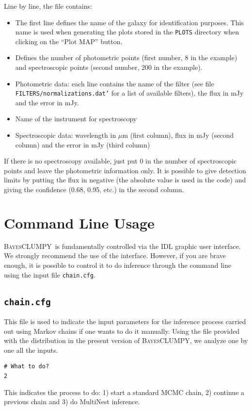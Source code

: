 \documentclass[12pt]{article}
\def\B{\textsc{BayesCLUMPY}}
\begin{document}
Line by line, the file contains:
\begin{itemize}
\item The first line defines the name of the galaxy for identification purposes. This
name is used when generating the plots stored in the \texttt{PLOTS} directory when
clicking on the ``Plot MAP'' button.
\item Defines the number of photometric points (first number, 8 in the example) and spectroscopic points (second number, 200 in the example).
\item Photometric data: each line contains the name of the filter (see file \texttt{FILTERS/normalizations.dat'} for
a list of available filters), the flux in mJy and the error in mJy.
\item Name of the instrument for spectroscopy
\item Spectroscopic data: wavelength in $\mu$m (first column), flux in mJy (second column) and the error in mJy (third column)
\end{itemize}
If there is no spectroscopy available, just put 0 in the number of spectroscopic points and leave the photometric information only.
It is possible to give detection limits by putting the flux in negative (the
absolute value is used in the code) and giving the confidence (0.68, 0.95, etc.) in the second
column.


\section{Command Line Usage}
\B\ is fundamentally controlled via the IDL graphic user interface. We strongly
recommend the use of the interface. However, if you are brave enough, it is
possible to control it to do inference through the command line
using the input file \texttt{chain.cfg}.

\subsection{\texttt{chain.cfg}}
This file is used to indicate the input parameters for the inference process
carried out using Markov chains if one wants to do it manually. Using the file
provided with the distribution in the present version of \B, we analyze one by one all the inputs.

\begin{verbatim}
# What to do?
2
\end{verbatim}
This indicates the process to do: 1) start a standard MCMC chain, 2) continue a previous chain and 3) do
MultiNest inference.
\end{document}
